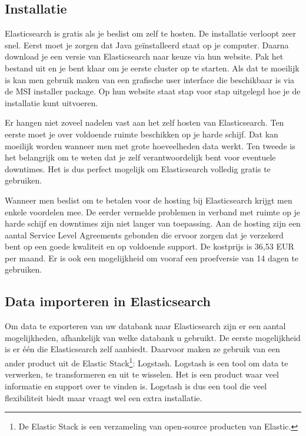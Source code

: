 {\subsection{Installatie}
\label{Installatie}

Elasticsearch is gratis als je beslist om zelf te hosten. De installatie verloopt zeer snel. Eerst moet je zorgen dat Java geïnstalleerd staat op je computer. Daarna download je een versie van Elasticsearch naar keuze via hun website. Pak het bestand uit en je bent klaar om je eerste cluster op te starten. Als dat te moeilijk is kan men gebruik maken van een grafische user interface die beschikbaar is via de MSI installer package. Op hun website staat stap voor stap uitgelegd hoe je de installatie kunt uitvoeren. 

Er hangen niet zoveel nadelen vast aan het zelf hosten van Elasticsearch. Ten eerste moet je over voldoende ruimte beschikken op je harde schijf. Dat kan moeilijk worden wanneer men met grote hoeveelheden data werkt. Ten tweede is het belangrijk om te weten dat je zelf verantwoordelijk bent voor eventuele downtimes. Het is dus perfect mogelijk om Elasticsearch volledig gratis te gebruiken. 

Wanneer men beslist om te betalen voor de hosting bij Elasticsearch krijgt men enkele voordelen mee. De eerder vermelde problemen in verband met ruimte op je harde schijf en downtimes zijn niet langer van toepassing.  Aan de hosting zijn een aantal Service Level Agreements gebonden die ervoor zorgen dat je verzekerd bent op een goede kwaliteit en op voldoende support. De kostprijs is 36,53 EUR per maand. Er is ook een mogelijkheid om vooraf een proefversie van 14 dagen te gebruiken.

\subsection{Data importeren in Elasticsearch}

Om data te exporteren van uw databank naar Elasticsearch zijn er een aantal mogelijkheden, afhankelijk van welke databank u gebruikt. De eerste mogelijkheid is er één die Elasticsearch zelf aanbiedt. Daarvoor maken ze gebruik van een ander product uit de Elastic Stack\footnote{De Elastic Stack is een verzameling van open-source producten van Elastic.}: Logstash. Logstash is een tool om data te verwerken, te transformeren en uit te wisselen. Het is een product waar veel informatie en support over te vinden is. Logstash is dus een tool die veel flexibiliteit biedt maar vraagt wel een extra installatie. 

}
